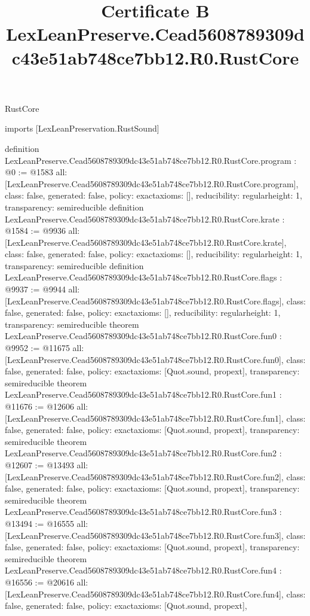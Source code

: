\begin{lexlean}{RustCore}
\title{Certificate B LexLeanPreserve.Cead5608789309dc43e51ab748ce7bb12.R0.RustCore}
\begin{coremodule}
imports [LexLeanPreservation.RustSound]

definition LexLeanPreserve.Cead5608789309dc43e51ab748ce7bb12.R0.RustCore.program : @0 := @1583 {
  all: [LexLeanPreserve.Cead5608789309dc43e51ab748ce7bb12.R0.RustCore.program],
  class: false,
  generated: false,
  policy: exact{axioms: []},
  reducibility: regular{height: 1},
  transparency: semireducible
}
definition LexLeanPreserve.Cead5608789309dc43e51ab748ce7bb12.R0.RustCore.krate : @1584 := @9936 {
  all: [LexLeanPreserve.Cead5608789309dc43e51ab748ce7bb12.R0.RustCore.krate],
  class: false,
  generated: false,
  policy: exact{axioms: []},
  reducibility: regular{height: 1},
  transparency: semireducible
}
definition LexLeanPreserve.Cead5608789309dc43e51ab748ce7bb12.R0.RustCore.flags : @9937 := @9944 {
  all: [LexLeanPreserve.Cead5608789309dc43e51ab748ce7bb12.R0.RustCore.flags],
  class: false,
  generated: false,
  policy: exact{axioms: []},
  reducibility: regular{height: 1},
  transparency: semireducible
}
theorem LexLeanPreserve.Cead5608789309dc43e51ab748ce7bb12.R0.RustCore.fun0 : @9952 := @11675 {
  all: [LexLeanPreserve.Cead5608789309dc43e51ab748ce7bb12.R0.RustCore.fun0],
  class: false,
  generated: false,
  policy: exact{axioms: [Quot.sound, propext]},
  transparency: semireducible
}
theorem LexLeanPreserve.Cead5608789309dc43e51ab748ce7bb12.R0.RustCore.fun1 : @11676 := @12606 {
  all: [LexLeanPreserve.Cead5608789309dc43e51ab748ce7bb12.R0.RustCore.fun1],
  class: false,
  generated: false,
  policy: exact{axioms: [Quot.sound, propext]},
  transparency: semireducible
}
theorem LexLeanPreserve.Cead5608789309dc43e51ab748ce7bb12.R0.RustCore.fun2 : @12607 := @13493 {
  all: [LexLeanPreserve.Cead5608789309dc43e51ab748ce7bb12.R0.RustCore.fun2],
  class: false,
  generated: false,
  policy: exact{axioms: [Quot.sound, propext]},
  transparency: semireducible
}
theorem LexLeanPreserve.Cead5608789309dc43e51ab748ce7bb12.R0.RustCore.fun3 : @13494 := @16555 {
  all: [LexLeanPreserve.Cead5608789309dc43e51ab748ce7bb12.R0.RustCore.fun3],
  class: false,
  generated: false,
  policy: exact{axioms: [Quot.sound, propext]},
  transparency: semireducible
}
theorem LexLeanPreserve.Cead5608789309dc43e51ab748ce7bb12.R0.RustCore.fun4 : @16556 := @20616 {
  all: [LexLeanPreserve.Cead5608789309dc43e51ab748ce7bb12.R0.RustCore.fun4],
  class: false,
  generated: false,
  policy: exact{axioms: [Quot.sound, propext]},
}
\end{coremodule}
\end{lexlean}
